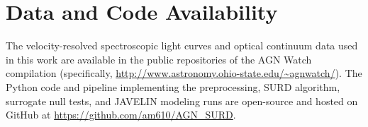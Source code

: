 \documentclass[12pt, a4paper]{article}
\begin{document}
\section*{Data and Code Availability}
The velocity-resolved spectroscopic light curves and optical continuum data used in this work are available in the public repositories of the AGN Watch compilation (specifically, \url{http://www.astronomy.ohio-state.edu/~agnwatch/}). The Python code and pipeline implementing the preprocessing, SURD algorithm, surrogate null tests, and JAVELIN modeling runs are open-source and hosted on GitHub at \url{https://github.com/am610/AGN_SURD}.

\printbibliography

%
%
\end{document}
